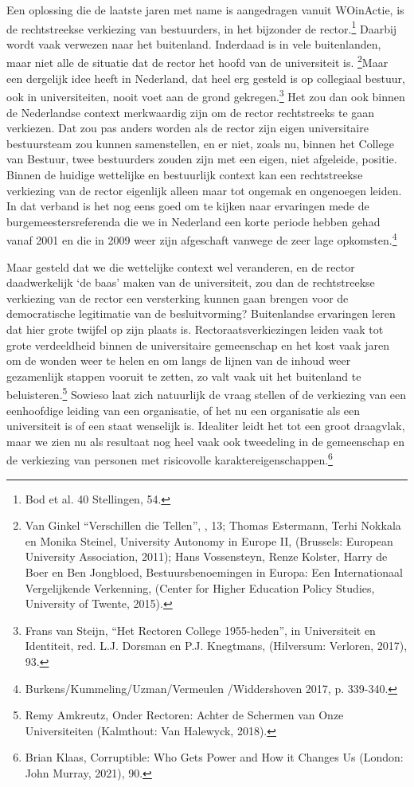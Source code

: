 \documentclass[empirical, authordate, ]{new-jote-article}
\begin{document}
	Een oplossing die de laatste jaren met name is aangedragen vanuit WOinActie, is de rechtstreekse verkiezing van bestuurders, in het bijzonder de rector.\footnote{Bod et al. 40 Stellingen, 54.} Daarbij wordt vaak verwezen naar het buitenland. Inderdaad is in vele buitenlanden, maar niet alle de situatie dat de rector het hoofd van de universiteit is.\textsuperscript{ }\footnote{Van Ginkel “Verschillen die Tellen”, , 13; Thomas Estermann, Terhi Nokkala en Monika Steinel, University Autonomy in Europe II, (Brussels: European University Association, 2011); Hans Vossensteyn, Renze Kolster, Harry de Boer en Ben Jongbloed, Bestuursbenoemingen in Europa: Een Internationaal Vergelijkende Verkenning, (Center for Higher Education Policy Studies, University of Twente, 2015).}Maar een dergelijk idee heeft in Nederland, dat heel erg gesteld is op collegiaal bestuur, ook in universiteiten, nooit voet aan de grond gekregen.\footnote{Frans van Steijn, “Het Rectoren College 1955-heden”, in Universiteit en Identiteit, red. L.J. Dorsman en P.J. Knegtmans, (Hilversum: Verloren, 2017), 93.} Het zou dan ook binnen de Nederlandse context merkwaardig zijn om de rector rechtstreeks te gaan verkiezen. Dat zou pas anders worden als de rector zijn eigen universitaire bestuursteam zou kunnen samenstellen, en er niet, zoals nu, binnen het College van Bestuur, twee bestuurders zouden zijn met een eigen, niet afgeleide, positie. Binnen de huidige wettelijke en bestuurlijk context kan een rechtstreekse verkiezing van de rector eigenlijk alleen maar tot ongemak en ongenoegen leiden. In dat verband is het nog eens goed om te kijken naar ervaringen mede de burgemeestersreferenda die we in Nederland een korte periode hebben gehad vanaf 2001 en die in 2009 weer zijn afgeschaft vanwege de zeer lage opkomsten.\footnote{Burkens/Kummeling/Uzman/Vermeulen /Widdershoven 2017, p. 339-340.}



	Maar gesteld dat we die wettelijke context wel veranderen, en de rector daadwerkelijk ‘de baas' maken van de universiteit, zou dan de rechtstreekse verkiezing van de rector een versterking kunnen gaan brengen voor de democratische legitimatie van de besluitvorming? Buitenlandse ervaringen leren dat hier grote twijfel op zijn plaats is. Rectoraatsverkiezingen leiden vaak tot grote verdeeldheid binnen de universitaire gemeenschap en het kost vaak jaren om de wonden weer te helen en om langs de lijnen van de inhoud weer gezamenlijk stappen vooruit te zetten, zo valt vaak uit het buitenland te beluisteren.\footnote{Remy Amkreutz, Onder Rectoren: Achter de Schermen van Onze Universiteiten (Kalmthout: Van Halewyck, 2018).} Sowieso laat zich natuurlijk de vraag stellen of de verkiezing van een eenhoofdige leiding van een organisatie, of het nu een organisatie als een universiteit is of een staat wenselijk is. Idealiter leidt het tot een groot draagvlak, maar we zien nu als resultaat nog heel vaak ook tweedeling in de gemeenschap en de verkiezing van personen met risicovolle karaktereigenschappen.\footnote{Brian Klaas, Corruptible: Who Gets Power and How it Changes Us (London: John Murray, 2021), 90.}
\end{document}
